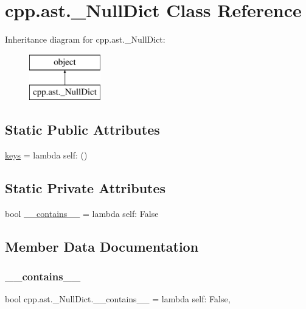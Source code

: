 \hypertarget{classcpp_1_1ast_1_1___null_dict}{}\section{cpp.\+ast.\+\_\+\+Null\+Dict Class Reference}
\label{classcpp_1_1ast_1_1___null_dict}
Inheritance diagram for cpp.\+ast.\+\_\+\+Null\+Dict\+:\begin{figure}[H]
\begin{center}
\leavevmode
\includegraphics[height=2.000000cm]{d6/d0f/classcpp_1_1ast_1_1___null_dict}
\end{center}
\end{figure}
\subsection*{Static Public Attributes}
\begin{DoxyCompactItemize}
\item 
\mbox{\hyperlink{classcpp_1_1ast_1_1___null_dict_abb0b7884aa59bede0a8503dffcd1733f}{keys}} = lambda self\+: ()
\end{DoxyCompactItemize}
\subsection*{Static Private Attributes}
\begin{DoxyCompactItemize}
\item 
bool \mbox{\hyperlink{classcpp_1_1ast_1_1___null_dict_a75119a0b9fd6366573f41d7e9eddec80}{\+\_\+\+\_\+contains\+\_\+\+\_\+}} = lambda self\+: False
\end{DoxyCompactItemize}


\subsection{Member Data Documentation}
\mbox{\label{classcpp_1_1ast_1_1___null_dict_a75119a0b9fd6366573f41d7e9eddec80}} 
\subsubsection{\texorpdfstring{\_\_contains\_\_}{\_\_contains\_\_}}
{\footnotesize\ttfamily bool cpp.\+ast.\+\_\+\+Null\+Dict.\+\_\+\+\_\+contains\+\_\+\+\_\+ = lambda self\+: False\hspace{0.3cm}{\ttfamily [static]}, {\ttfamily [private]}}

